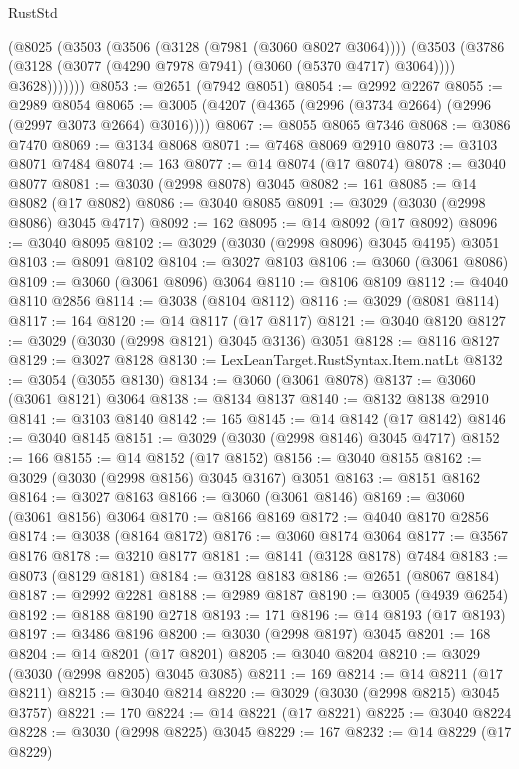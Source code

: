 \begin{lexlean}{RustStd}
\begin{coremodule}
            (@8025
              (@3503
                (@3506 (@3128 (@7981 (@3060 @8027 @3064))))
                (@3503
                  (@3786 (@3128 (@3077 (@4290 @7978 @7941) (@3060 (@5370 @4717) @3064))))
                  @3628)))))))
@8053 := @2651 (@7942 @8051)
@8054 := @2992 @2267
@8055 := @2989 @8054
@8065 := @3005 (@4207 (@4365 (@2996 (@3734 @2664) (@2996 (@2997 @3073 @2664) @3016))))
@8067 := @8055 @8065 @7346
@8068 := @3086 @7470
@8069 := @3134 @8068
@8071 := @7468 @8069 @2910
@8073 := @3103 @8071 @7484
@8074 := 163
@8077 := @14 @8074 (@17 @8074)
@8078 := @3040 @8077
@8081 := @3030 (@2998 @8078) @3045
@8082 := 161
@8085 := @14 @8082 (@17 @8082)
@8086 := @3040 @8085
@8091 := @3029 (@3030 (@2998 @8086) @3045 @4717)
@8092 := 162
@8095 := @14 @8092 (@17 @8092)
@8096 := @3040 @8095
@8102 := @3029 (@3030 (@2998 @8096) @3045 @4195) @3051
@8103 := @8091 @8102
@8104 := @3027 @8103
@8106 := @3060 (@3061 @8086)
@8109 := @3060 (@3061 @8096) @3064
@8110 := @8106 @8109
@8112 := @4040 @8110 @2856
@8114 := @3038 (@8104 @8112)
@8116 := @3029 (@8081 @8114)
@8117 := 164
@8120 := @14 @8117 (@17 @8117)
@8121 := @3040 @8120
@8127 := @3029 (@3030 (@2998 @8121) @3045 @3136) @3051
@8128 := @8116 @8127
@8129 := @3027 @8128
@8130 := LexLeanTarget.RustSyntax.Item.natLt
@8132 := @3054 (@3055 @8130)
@8134 := @3060 (@3061 @8078)
@8137 := @3060 (@3061 @8121) @3064
@8138 := @8134 @8137
@8140 := @8132 @8138 @2910
@8141 := @3103 @8140
@8142 := 165
@8145 := @14 @8142 (@17 @8142)
@8146 := @3040 @8145
@8151 := @3029 (@3030 (@2998 @8146) @3045 @4717)
@8152 := 166
@8155 := @14 @8152 (@17 @8152)
@8156 := @3040 @8155
@8162 := @3029 (@3030 (@2998 @8156) @3045 @3167) @3051
@8163 := @8151 @8162
@8164 := @3027 @8163
@8166 := @3060 (@3061 @8146)
@8169 := @3060 (@3061 @8156) @3064
@8170 := @8166 @8169
@8172 := @4040 @8170 @2856
@8174 := @3038 (@8164 @8172)
@8176 := @3060 @8174 @3064
@8177 := @3567 @8176
@8178 := @3210 @8177
@8181 := @8141 (@3128 @8178) @7484
@8183 := @8073 (@8129 @8181)
@8184 := @3128 @8183
@8186 := @2651 (@8067 @8184)
@8187 := @2992 @2281
@8188 := @2989 @8187
@8190 := @3005 (@4939 @6254)
@8192 := @8188 @8190 @2718
@8193 := 171
@8196 := @14 @8193 (@17 @8193)
@8197 := @3486 @8196
@8200 := @3030 (@2998 @8197) @3045
@8201 := 168
@8204 := @14 @8201 (@17 @8201)
@8205 := @3040 @8204
@8210 := @3029 (@3030 (@2998 @8205) @3045 @3085)
@8211 := 169
@8214 := @14 @8211 (@17 @8211)
@8215 := @3040 @8214
@8220 := @3029 (@3030 (@2998 @8215) @3045 @3757)
@8221 := 170
@8224 := @14 @8221 (@17 @8221)
@8225 := @3040 @8224
@8228 := @3030 (@2998 @8225) @3045
@8229 := 167
@8232 := @14 @8229 (@17 @8229)

\end{coremodule}
\end{lexlean}
